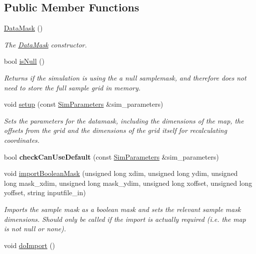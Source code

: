 \subsection*{Public Member Functions}
\begin{DoxyCompactItemize}
\item 
\hyperlink{class_data_mask_ae89a953b8200f027d44dc74fa748852b}{Data\+Mask} ()\hypertarget{class_data_mask_ae89a953b8200f027d44dc74fa748852b}{}\label{class_data_mask_ae89a953b8200f027d44dc74fa748852b}

\begin{DoxyCompactList}\small\item\em The \hyperlink{class_data_mask}{Data\+Mask} constructor. \end{DoxyCompactList}\item 
bool \hyperlink{class_data_mask_a9aa4ee43e6c20f4b7c3e8404ee12345b}{is\+Null} ()
\begin{DoxyCompactList}\small\item\em Returns if the simulation is using the a null samplemask, and therefore does not need to store the full sample grid in memory. \end{DoxyCompactList}\item 
void \hyperlink{class_data_mask_ab6a4e6f63856f96805ddc79022c47104}{setup} (const \hyperlink{struct_sim_parameters}{Sim\+Parameters} \&sim\+\_\+parameters)
\begin{DoxyCompactList}\small\item\em Sets the parameters for the datamask, including the dimensions of the map, the offsets from the grid and the dimensions of the grid itself for recalculating coordinates. \end{DoxyCompactList}\item 
bool {\bfseries check\+Can\+Use\+Default} (const \hyperlink{struct_sim_parameters}{Sim\+Parameters} \&sim\+\_\+parameters)\hypertarget{class_data_mask_ae5bf5df7975431338e3ea757e6f2fac9}{}\label{class_data_mask_ae5bf5df7975431338e3ea757e6f2fac9}

\item 
void \hyperlink{class_data_mask_aac63b47c3688db359760f6134d30f239}{import\+Boolean\+Mask} (unsigned long xdim, unsigned long ydim, unsigned long mask\+\_\+xdim, unsigned long mask\+\_\+ydim, unsigned long xoffset, unsigned long yoffset, string inputfile\+\_\+in)
\begin{DoxyCompactList}\small\item\em Imports the sample mask as a boolean mask and sets the relevant sample mask dimensions. Should only be called if the import is actually required (i.\+e. the map is not null or none). \end{DoxyCompactList}\item 
void \hyperlink{class_data_mask_a85f7b85bb4ac54aa884a8a06f1d35d1b}{do\+Import} ()\hypertarget{class_data_mask_a85f7b85bb4ac54aa884a8a06f1d35d1b}{}\label{class_data_mask_a85f7b85bb4ac54aa884a8a06f1d35d1b}


\end{DoxyCompactItemize}
